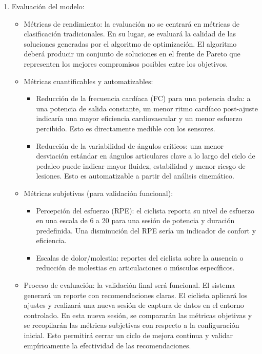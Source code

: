 \documentclass[
11pt, %
]{charter}
\begin{document}
\begin{enumerate}
  \item Evaluación del modelo:
\begin{itemize}
    \item Métricas de rendimiento: la evaluación no se centrará en métricas de clasificación tradicionales. En su lugar, se evaluará la calidad de las soluciones generadas por el algoritmo de optimización. El algoritmo deberá producir un conjunto de soluciones en el frente de Pareto que representen los mejores compromisos posibles entre los objetivos.
    \item Métricas cuantificables y automatizables:
    \begin{itemize}
        \item Reducción de la frecuencia cardíaca (FC) para una potencia dada: a una potencia de salida constante, un menor ritmo cardíaco post-ajuste indicaría una mayor eficiencia cardiovascular y un menor esfuerzo percibido. Esto es directamente medible con los sensores.
        \item Reducción de la variabilidad de ángulos críticos: una menor desviación estándar en ángulos articulares clave a lo largo del ciclo de pedaleo puede indicar mayor fluidez, estabilidad y menor riesgo de lesiones. Esto es automatizable a partir del análisis cinemático.
    \end{itemize}
    \item Métricas subjetivas (para validación funcional):
    \begin{itemize}
        \item Percepción del esfuerzo (RPE): el ciclista reporta su nivel de esfuerzo en una escala de 6 a 20 para una sesión de potencia y duración predefinida. Una disminución del RPE sería un indicador de confort y eficiencia.
        \item Escalas de dolor/molestia: reportes del ciclista sobre la ausencia o reducción de molestias en articulaciones o músculos específicos.
    \end{itemize}
    \item Proceso de evaluación: la validación final será funcional. El sistema generará un reporte con recomendaciones claras. El ciclista aplicará los ajustes y realizará una nueva sesión de captura de datos en el entorno controlado. En esta nueva sesión, se compararán las métricas objetivas y se recopilarán las métricas subjetivas con respecto a la configuración inicial. Esto permitirá cerrar un ciclo de mejora continua y validar empíricamente la efectividad de las recomendaciones.
\end{itemize}
\end{enumerate}
\end{document}

